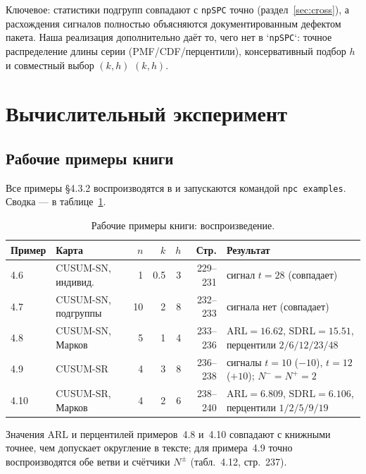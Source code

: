 \documentclass[11pt,a4paper]{article}
\newcommand{\ARL}{\mathrm{ARL}}
\newcommand{\SDRL}{\mathrm{SDRL}}
\begin{document}
\noindent
Ключевое: статистики подгрупп совпадают с \texttt{npSPC} точно
(раздел~\ref{sec:cross}), а расхождения сигналов полностью объясняются
документированным дефектом пакета. Наша реализация дополнительно даёт
то, чего нет в `\texttt{npSPC}`: точное распределение длины серии
(PMF/CDF/перцентили), консервативный подбор $h$ и совместный выбор $(k,h)$
$(k,h)$.

\section{Вычислительный эксперимент}
\label{sec:exp}

\subsection{Рабочие примеры книги}
\label{sec:exp-examples}

Все примеры \S4.3.2 воспроизводятся в  и запускаются
командой \texttt{npc examples}. Сводка --- в таблице~\ref{tab:examples}.

\begin{table}[htbp]\centering
\caption{Рабочие примеры книги: воспроизведение.}
\label{tab:examples}
\small
\begin{tabular}{@{}l l r r r r p{4.0cm}@{}}
\toprule
Пример & Карта & $n$ & $k$ & $h$ & Стр. & Результат \\
\midrule
4.6 & CUSUM-SN, индивид. & 1 & 0.5 & 3 & 229--231 &
сигнал $t=28$ (совпадает) \\
4.7 & CUSUM-SN, подгруппы & 10 & 2 & 8 & 232--233 &
сигнала нет (совпадает) \\
4.8 & CUSUM-SN, Марков & 5 & 1 & 4 & 233--236 &
$\ARL=16.62$, $\SDRL=15.51$, перцентили $2/6/12/23/48$ \\
4.9 & CUSUM-SR & 4 & 3 & 8 & 236--238 &
сигналы $t=10$ ($-10$), $t=12$ ($+10$); $N^-=N^+=2$ \\
4.10 & CUSUM-SR, Марков & 4 & 2 & 6 & 238--240 &
$\ARL=6.809$, $\SDRL=6.106$, перцентили $1/2/5/9/19$ \\
\bottomrule
\end{tabular}
\normalsize
\end{table}

\noindent
Значения $\ARL$ и перцентилей примеров~4.8 и~4.10 совпадают с книжными
точнее, чем допускает округление в тексте; для примера~4.9 точно
воспроизводятся обе ветви и счётчики $N^\pm$ (табл.~4.12, стр.~237).
\end{document}
